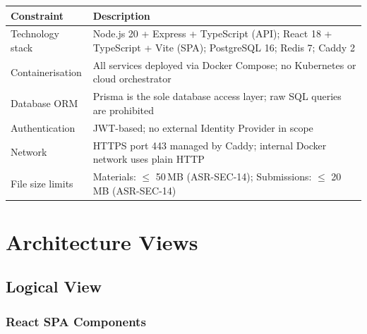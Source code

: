\documentclass[12pt,a4paper]{article}
\begin{document}
\begin{tabularx}{\textwidth}{L{3.5cm} L{10cm}}
  \toprule
  \textbf{Constraint} & \textbf{Description} \\
  \midrule
  Technology stack & Node.js 20 + Express + TypeScript (API); React 18 + TypeScript + Vite (SPA); PostgreSQL 16; Redis 7; Caddy 2 \\
  Containerisation & All services deployed via Docker Compose; no Kubernetes or cloud orchestrator \\
  Database ORM & Prisma is the sole database access layer; raw SQL queries are prohibited \\
  Authentication & JWT-based; no external Identity Provider in scope \\
  Network & HTTPS port 443 managed by Caddy; internal Docker network uses plain HTTP \\
  File size limits & Materials: $\leq$ 50\,MB (ASR-SEC-14); Submissions: $\leq$ 20\,MB (ASR-SEC-14) \\
  \bottomrule
\end{tabularx}

\section{Architecture Views}

\subsection{Logical View}

\subsubsection{React SPA Components}
\end{document}
